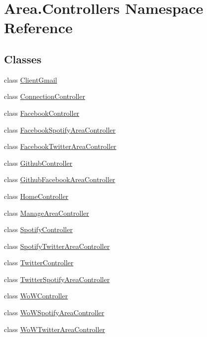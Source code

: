 \hypertarget{namespaceArea_1_1Controllers}{}\section{Area.\+Controllers Namespace Reference}
\label{namespaceArea_1_1Controllers}
\subsection*{Classes}
\begin{DoxyCompactItemize}
\item 
class \mbox{\hyperlink{classArea_1_1Controllers_1_1ClientGmail}{Client\+Gmail}}
\item 
class \mbox{\hyperlink{classArea_1_1Controllers_1_1ConnectionController}{Connection\+Controller}}
\item 
class \mbox{\hyperlink{classArea_1_1Controllers_1_1FacebookController}{Facebook\+Controller}}
\item 
class \mbox{\hyperlink{classArea_1_1Controllers_1_1FacebookSpotifyAreaController}{Facebook\+Spotify\+Area\+Controller}}
\item 
class \mbox{\hyperlink{classArea_1_1Controllers_1_1FacebookTwitterAreaController}{Facebook\+Twitter\+Area\+Controller}}
\item 
class \mbox{\hyperlink{classArea_1_1Controllers_1_1GithubController}{Github\+Controller}}
\item 
class \mbox{\hyperlink{classArea_1_1Controllers_1_1GithubFacebookAreaController}{Github\+Facebook\+Area\+Controller}}
\item 
class \mbox{\hyperlink{classArea_1_1Controllers_1_1HomeController}{Home\+Controller}}
\item 
class \mbox{\hyperlink{classArea_1_1Controllers_1_1ManageAreaController}{Manage\+Area\+Controller}}
\item 
class \mbox{\hyperlink{classArea_1_1Controllers_1_1SpotifyController}{Spotify\+Controller}}
\item 
class \mbox{\hyperlink{classArea_1_1Controllers_1_1SpotifyTwitterAreaController}{Spotify\+Twitter\+Area\+Controller}}
\item 
class \mbox{\hyperlink{classArea_1_1Controllers_1_1TwitterController}{Twitter\+Controller}}
\item 
class \mbox{\hyperlink{classArea_1_1Controllers_1_1TwitterSpotifyAreaController}{Twitter\+Spotify\+Area\+Controller}}
\item 
class \mbox{\hyperlink{classArea_1_1Controllers_1_1WoWController}{Wo\+W\+Controller}}
\item 
class \mbox{\hyperlink{classArea_1_1Controllers_1_1WoWSpotifyAreaController}{Wo\+W\+Spotify\+Area\+Controller}}
\item 
class \mbox{\hyperlink{classArea_1_1Controllers_1_1WoWTwitterAreaController}{Wo\+W\+Twitter\+Area\+Controller}}
\end{DoxyCompactItemize}

